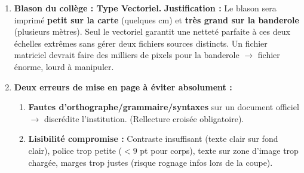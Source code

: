 \documentclass[11pt]{article}
\newcommand{\cle}[1]{{\popxbold\color{popdark}#1}}
\begin{document}
\begin{corrige}
\begin{enumerate}
\begin{enumerate}
\begin{itemize}
\item \textbf{Couleurs :} 2 à 3 max (ex : Bleu marine/Or du blason + Blanc + Gris foncé). Respect de la charte graphique du collège. Contraste élevé texte/fond pour lisibilité.
\item \textbf{Polices :} \textbf{2 maximum}. Ex : \texttt{Georgia} ou \texttt{Garamond} (serif, solennel) pour le corps ; \texttt{Montserrat} ou \texttt{Playfair Display} (titre/Blason). Interdiction : Comic Sans, polices fantaisies illisibles.
\end{itemize}
\end{enumerate}

\item \textbf{Blason du collège : Type \cle{Vectoriel}.}
\textbf{Justification :} Le blason sera imprimé \textbf{petit sur la carte} (quelques cm) et \textbf{très grand sur la banderole} (plusieurs mètres). Seul le vectoriel garantit une netteté parfaite à ces deux échelles extrêmes sans gérer deux fichiers sources distincts. Un fichier matriciel devrait faire des milliers de pixels pour la banderole $\rightarrow$ fichier énorme, lourd à manipuler.

\item \textbf{Deux erreurs de mise en page à éviter absolument :}
\begin{enumerate}
\item \textbf{Fautes d'orthographe/grammaire/syntaxes} sur un document officiel $\rightarrow$ discrédite l'institution. (Rellecture croisée obligatoire).
\item \textbf{Lisibilité compromise :} Contraste insuffisant (texte clair sur fond clair), police trop petite ($< 9$ pt pour corps), texte sur zone d'image trop chargée, marges trop justes (risque rognage infos lors de la coupe).
\end{enumerate}
\end{enumerate}
\end{corrige}
\end{document}
